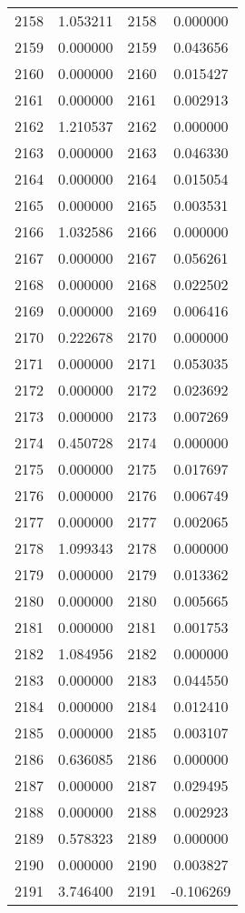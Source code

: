 \documentclass[12pt]{article}
\begin{document}
\begin{longtable}{@{}cccc@{}}
2158 & 1.053211 & 2158 & 0.000000 \\
2159 & 0.000000 & 2159 & 0.043656 \\
2160 & 0.000000 & 2160 & 0.015427 \\
2161 & 0.000000 & 2161 & 0.002913 \\
2162 & 1.210537 & 2162 & 0.000000 \\
2163 & 0.000000 & 2163 & 0.046330 \\
2164 & 0.000000 & 2164 & 0.015054 \\
2165 & 0.000000 & 2165 & 0.003531 \\
2166 & 1.032586 & 2166 & 0.000000 \\
2167 & 0.000000 & 2167 & 0.056261 \\
2168 & 0.000000 & 2168 & 0.022502 \\
2169 & 0.000000 & 2169 & 0.006416 \\
2170 & 0.222678 & 2170 & 0.000000 \\
2171 & 0.000000 & 2171 & 0.053035 \\
2172 & 0.000000 & 2172 & 0.023692 \\
2173 & 0.000000 & 2173 & 0.007269 \\
2174 & 0.450728 & 2174 & 0.000000 \\
2175 & 0.000000 & 2175 & 0.017697 \\
2176 & 0.000000 & 2176 & 0.006749 \\
2177 & 0.000000 & 2177 & 0.002065 \\
2178 & 1.099343 & 2178 & 0.000000 \\
2179 & 0.000000 & 2179 & 0.013362 \\
2180 & 0.000000 & 2180 & 0.005665 \\
2181 & 0.000000 & 2181 & 0.001753 \\
2182 & 1.084956 & 2182 & 0.000000 \\
2183 & 0.000000 & 2183 & 0.044550 \\
2184 & 0.000000 & 2184 & 0.012410 \\
2185 & 0.000000 & 2185 & 0.003107 \\
2186 & 0.636085 & 2186 & 0.000000 \\
2187 & 0.000000 & 2187 & 0.029495 \\
2188 & 0.000000 & 2188 & 0.002923 \\
2189 & 0.578323 & 2189 & 0.000000 \\
2190 & 0.000000 & 2190 & 0.003827 \\
2191 & 3.746400 & 2191 & -0.106269 \\

\end{longtable}
\end{document}
